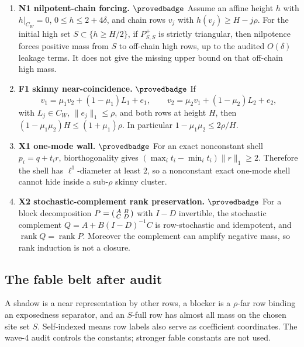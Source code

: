 \begin{enumerate}[leftmargin=*,itemsep=0.5ex]
\item \textbf{N1 nilpotent-chain forcing.} \(\provedbadge\)
Assume an affine height \(h\) with \(h|_{C_W}=0\),
\(0\le h\le 2+4\delta\), and chain rows \(v_j\) with
\(h(v_j)\ge H-j\rho\).  For the initial high set
\(S\subset\{h\ge H/2\}\), if \(P^+_{S,S}\) is strictly triangular, then
nilpotence forces positive mass from \(S\) to off-chain high rows, up to
the audited \(O(\delta)\) leakage terms.  It does not give the missing
upper bound on that off-chain high mass.

\item \textbf{F1 skinny near-coincidence.} \(\provedbadge\)
If
\[
v_1=\mu_1v_2+(1-\mu_1)L_1+e_1,\qquad
v_2=\mu_2v_1+(1-\mu_2)L_2+e_2,
\]
with \(L_j\in C_W\), \(\|e_j\|_1\le\rho\), and both rows at height \(H\),
then
\((1-\mu_1\mu_2)H\le (1+\mu_1)\rho\).  In particular
\(1-\mu_1\mu_2\le 2\rho/H\).

\item \textbf{X1 one-mode wall.} \(\provedbadge\)
For an exact nonconstant shell \(p_i=q+t_i r\), biorthogonality gives
\((\max_i t_i-\min_i t_i)\|r\|_1\ge 2\).  Therefore the shell has
\(\ell^1\)-diameter at least \(2\), so a nonconstant exact one-mode shell
cannot hide inside a sub-\(\rho\) skinny cluster.

\item \textbf{X2 stochastic-complement rank preservation.} \(\provedbadge\)
For a block decomposition \(P=\begin{psmallmatrix}A&B\\ C&D\end{psmallmatrix}\)
with \(I-D\) invertible, the stochastic complement
\(Q=A+B(I-D)^{-1}C\) is row-stochastic and idempotent, and
\(\operatorname{rank}Q=\operatorname{rank}P\).  Moreover the complement
can amplify negative mass, so rank induction is not a closure.
\end{enumerate}

\subsection{The fable belt after audit}

A shadow is a near representation by other rows, a blocker is a
\(\rho\)-far row binding an exposedness separator, and an \(S\)-full row
has almost all mass on the chosen site set \(S\).  Self-indexed means row
labels also serve as coefficient coordinates.  The wave-4 audit controls
the constants; stronger fable constants are not used.

